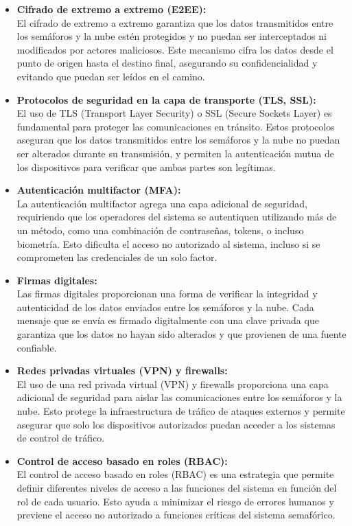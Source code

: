 \documentclass[12pt,a4paper,oneside]{report}
\begin{document}
\begin{itemize}
\item
  \textbf{Cifrado de extremo a extremo (E2EE):\\
  }El cifrado de extremo a extremo garantiza que los datos transmitidos entre los semáforos y la nube estén protegidos y no puedan ser interceptados ni modificados por actores maliciosos. Este mecanismo cifra los datos desde el punto de origen hasta el destino final, asegurando su confidencialidad y evitando que puedan ser leídos en el camino.
\item
  \textbf{Protocolos de seguridad en la capa de transporte (TLS, SSL):\\
  }El uso de TLS (Transport Layer Security) o SSL (Secure Sockets Layer) es fundamental para proteger las comunicaciones en tránsito. Estos protocolos aseguran que los datos transmitidos entre los semáforos y la nube no puedan ser alterados durante su transmisión, y permiten la autenticación mutua de los dispositivos para verificar que ambas partes son legítimas.
\item
  \textbf{Autenticación multifactor (MFA):\\
  }La autenticación multifactor agrega una capa adicional de seguridad, requiriendo que los operadores del sistema se autentiquen utilizando más de un método, como una combinación de contraseñas, tokens, o incluso biometría. Esto dificulta el acceso no autorizado al sistema, incluso si se comprometen las credenciales de un solo factor.
\item
  \textbf{Firmas digitales:\\
  }Las firmas digitales proporcionan una forma de verificar la integridad y autenticidad de los datos enviados entre los semáforos y la nube. Cada mensaje que se envía es firmado digitalmente con una clave privada que garantiza que los datos no hayan sido alterados y que provienen de una fuente confiable.
\item
  \textbf{Redes privadas virtuales (VPN) y firewalls:\\
  }El uso de una red privada virtual (VPN) y firewalls proporciona una capa adicional de seguridad para aislar las comunicaciones entre los semáforos y la nube. Esto protege la infraestructura de tráfico de ataques externos y permite asegurar que solo los dispositivos autorizados puedan acceder a los sistemas de control de tráfico.
\item
  \textbf{Control de acceso basado en roles (RBAC):\\
  }El control de acceso basado en roles (RBAC) es una estrategia que permite definir diferentes niveles de acceso a las funciones del sistema en función del rol de cada usuario. Esto ayuda a minimizar el riesgo de errores humanos y previene el acceso no autorizado a funciones críticas del sistema semafórico.

\end{itemize}
\end{document}
